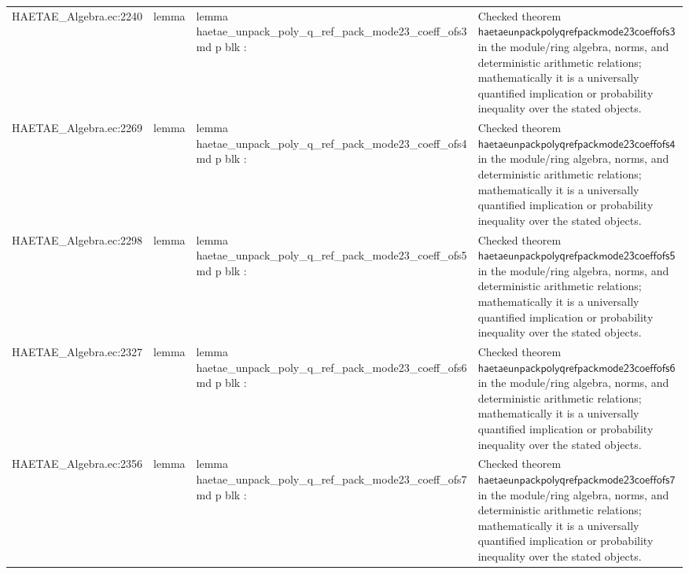 \documentclass[10pt]{article}
\begin{document}
\begin{longtable}{L{0.11\textwidth}L{0.055\textwidth}L{0.385\textwidth}L{0.41\textwidth}}
HAETAE\_\allowbreak{}Algebra.\allowbreak{}ec:\allowbreak{}2240 & lemma & {\ttfamily\scriptsize lemma haetae\_\allowbreak{}unpack\_\allowbreak{}poly\_\allowbreak{}q\_\allowbreak{}ref\_\allowbreak{}pack\_\allowbreak{}mode23\_\allowbreak{}coeff\_\allowbreak{}ofs3 md p blk :} & Checked theorem $\mathsf{haetaeunpackpolyqrefpackmode23coeffofs3}$ in the module/ring algebra, norms, and deterministic arithmetic relations; mathematically it is a universally quantified implication or probability inequality over the stated objects. \\
HAETAE\_\allowbreak{}Algebra.\allowbreak{}ec:\allowbreak{}2269 & lemma & {\ttfamily\scriptsize lemma haetae\_\allowbreak{}unpack\_\allowbreak{}poly\_\allowbreak{}q\_\allowbreak{}ref\_\allowbreak{}pack\_\allowbreak{}mode23\_\allowbreak{}coeff\_\allowbreak{}ofs4 md p blk :} & Checked theorem $\mathsf{haetaeunpackpolyqrefpackmode23coeffofs4}$ in the module/ring algebra, norms, and deterministic arithmetic relations; mathematically it is a universally quantified implication or probability inequality over the stated objects. \\
HAETAE\_\allowbreak{}Algebra.\allowbreak{}ec:\allowbreak{}2298 & lemma & {\ttfamily\scriptsize lemma haetae\_\allowbreak{}unpack\_\allowbreak{}poly\_\allowbreak{}q\_\allowbreak{}ref\_\allowbreak{}pack\_\allowbreak{}mode23\_\allowbreak{}coeff\_\allowbreak{}ofs5 md p blk :} & Checked theorem $\mathsf{haetaeunpackpolyqrefpackmode23coeffofs5}$ in the module/ring algebra, norms, and deterministic arithmetic relations; mathematically it is a universally quantified implication or probability inequality over the stated objects. \\
HAETAE\_\allowbreak{}Algebra.\allowbreak{}ec:\allowbreak{}2327 & lemma & {\ttfamily\scriptsize lemma haetae\_\allowbreak{}unpack\_\allowbreak{}poly\_\allowbreak{}q\_\allowbreak{}ref\_\allowbreak{}pack\_\allowbreak{}mode23\_\allowbreak{}coeff\_\allowbreak{}ofs6 md p blk :} & Checked theorem $\mathsf{haetaeunpackpolyqrefpackmode23coeffofs6}$ in the module/ring algebra, norms, and deterministic arithmetic relations; mathematically it is a universally quantified implication or probability inequality over the stated objects. \\
HAETAE\_\allowbreak{}Algebra.\allowbreak{}ec:\allowbreak{}2356 & lemma & {\ttfamily\scriptsize lemma haetae\_\allowbreak{}unpack\_\allowbreak{}poly\_\allowbreak{}q\_\allowbreak{}ref\_\allowbreak{}pack\_\allowbreak{}mode23\_\allowbreak{}coeff\_\allowbreak{}ofs7 md p blk :} & Checked theorem $\mathsf{haetaeunpackpolyqrefpackmode23coeffofs7}$ in the module/ring algebra, norms, and deterministic arithmetic relations; mathematically it is a universally quantified implication or probability inequality over the stated objects. \\

\end{longtable}
\end{document}
